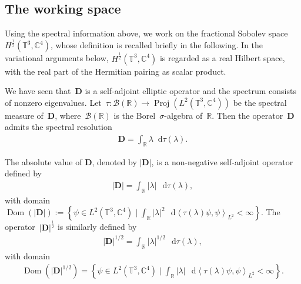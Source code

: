 \documentclass[11pt,final]{amsart}
\newcommand{\Abracket}[1]{\left<#1\right>} %
\newcommand{\R}{\mathbb{R}}
\newcommand{\C}{\mathbb{C}}
\newcommand{\T}{\mathbb{T}}
\newcommand{\dd}{\mathop{}\!\mathrm{d}}
\newcommand{\pD}{\mathbf{D}}
\DeclareMathOperator{\Dom}{Dom}
\begin{document}
\subsection{The working space}


Using the spectral information above, we work on the fractional Sobolev space~$H^{\frac{1}{2}}(\T^3,\C^4)$, whose definition is recalled briefly in the following. In the variational arguments below, $H^{\frac{1}{2}}(\mathbb T^3,\mathbb C^4)$ is regarded as a real Hilbert space, with the real part of the Hermitian pairing as scalar product.

We have seen that~$\pD$ is a self-adjoint elliptic operator and the spectrum consists of nonzero eigenvalues.
Let~$\tau \colon \mathcal{B}(\R)\to \operatorname{Proj}(L^2(\T^3,\C^4))$ be the spectral measure of~$\pD$, where~$\mathcal{B}(\R)$ is the Borel~$\sigma$-algebra of~$\R$.
Then the operator~$\pD$ admits the spectral resolution
\begin{align}
    \pD =\int_\R \lambda \dd\tau(\lambda).
\end{align}


The absolute value of $\pD$, denoted by $|\pD|$, is a non-negative self-adjoint operator defined by
\begin{align}
|\pD| = \int_{\mathbb{R}} |\lambda| \, \dd\tau(\lambda),
\end{align}
with domain $\Dom(|\pD|) := \left\{ \psi \in L^2(\mathbb{T}^3, \mathbb{C}^4) \mid \int_{\mathbb{R}} |\lambda|^2 \, \dd\Abracket{\tau(\lambda)\psi,\psi}_{L^2} < \infty \right\}$.
The operator~$|\pD|^{\frac{1}{2}}$ is similarly defined by
\begin{align}
|\pD|^{1/2} = \int_{\mathbb{R}} |\lambda|^{1/2} \, \dd\tau(\lambda),
\end{align}
with domain
\begin{align}
   \Dom(|\pD|^{1/2}) = \left\{ \psi \in L^2(\mathbb{T}^3, \mathbb{C}^4) \mid \int_{\mathbb{R}} |\lambda| \, \dd\Abracket{\tau(\lambda)\psi,\psi}_{L^2}  < \infty \right\}.
\end{align}
\end{document}
